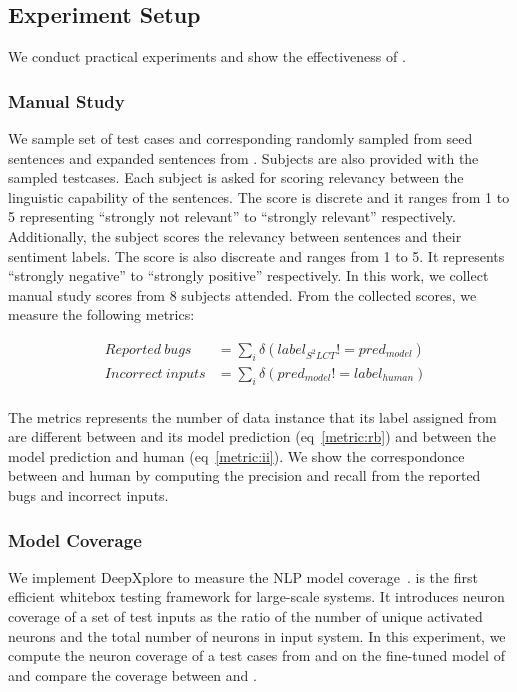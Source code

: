 \subsection{Experiment Setup}
We conduct practical experiments and show the effectiveness of
\tool.
\subsubsection*{\textbf{Manual Study}}
We sample set of test cases and corresponding \lc randomly sampled
from seed sentences and expanded sentences from \tool.  Subjects are
also provided with the sampled testcases. Each subject is asked for
scoring relevancy between the linguistic capability of the
sentences. The score is discrete and it ranges from 1 to 5
representing ``strongly not relevant'' to ``strongly relevant''
respectively. Additionally, the subject scores the relevancy between
sentences and their sentiment labels. The score is also discreate and
ranges from 1 to 5. It represents ``strongly negative'' to ``strongly
positive'' respectively. In this work, we collect manual study scores
from 8 subjects attended. From the collected scores, we measure the
following metrics:

\begin{eqnarray}
  &Reported\:bugs &=\sum_{i} \delta(label_{S^2LCT}!=pred_{model}) \label{metric:rb}\\
  &Incorrect\:inputs &= \sum_{i} \delta(pred_{model}!=label_{human}) \label{metric:ii}\\
\end{eqnarray}

The metrics represents the number of data instance that its label
assigned from are different between \tool and its model prediction
(eq~\ref{metric:rb}) and between the model prediction and human
(eq~\ref{metric:ii}). We show the correspondonce between \tool and
human by computing the precision and recall from the reported bugs and
incorrect inputs.

\subsubsection*{\textbf{Model Coverage}}
We implement DeepXplore to measure the NLP model
coverage~\cite{pei2017deepxplore}. \Dxp is the first efficient
whitebox testing framework for large-scale \dl systems. It introduces
neuron coverage of a set of test inputs as the ratio of the number of
unique activated neurons and the total number of neurons in input \dl
system. In this experiment, we compute the neuron coverage of a test
cases from \tool and \Cklst on the fine-tuned \sa model of
\bertsamodel and compare the coverage between \tool and \Cklst.


